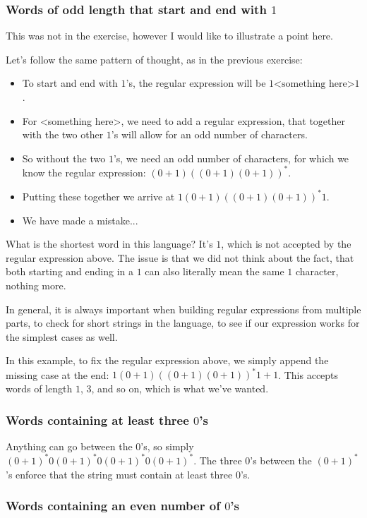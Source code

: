 \subsubsection{Words of odd length that start and end with $1$}

This was not in the exercise, however I would like to illustrate a point here.

Let's follow the same pattern of thought, as in the previous exercise:
\begin{itemize}
    \item To start and end with $1$'s, the regular expression will be $1\text{<something here>}1$. \item For <something here>, we need to add a regular expression, that together with the two other $1$'s will allow for an odd number of characters.
    \item So without the two $1$'s, we need an odd number of characters, for which we know the regular expression: $(0+1)((0+1)(0+1))^*$.
    \item Putting these together we arrive at $1(0+1)((0+1)(0+1))^*1$.
    \item We have made a mistake...
\end{itemize}

What is the shortest word in this language? It's $1$, which is not accepted by the regular expression above. The issue is that we did not think about the fact, that both starting and ending in a $1$ can also literally mean the same $1$ character, nothing more.

In general, it is always important when building regular expressions from multiple parts, to check for short strings in the language, to see if our expression works for the simplest cases as well.

In this example, to fix the regular expression above, we simply append the missing case at the end: $1(0+1)((0+1)(0+1))^*1 + 1$. This accepts words of length $1$, $3$, and so on, which is what we've wanted.

\subsubsection{Words containing at least three $0$'s}

Anything can go between the $0$'s, so simply $(0+1)^*0(0+1)^*0(0+1)^*0(0+1)^*$. The three $0$'s between the $(0+1)^*$'s enforce that the string must contain at least three $0$'s.

\subsubsection{Words containing an even number of $0$'s}

